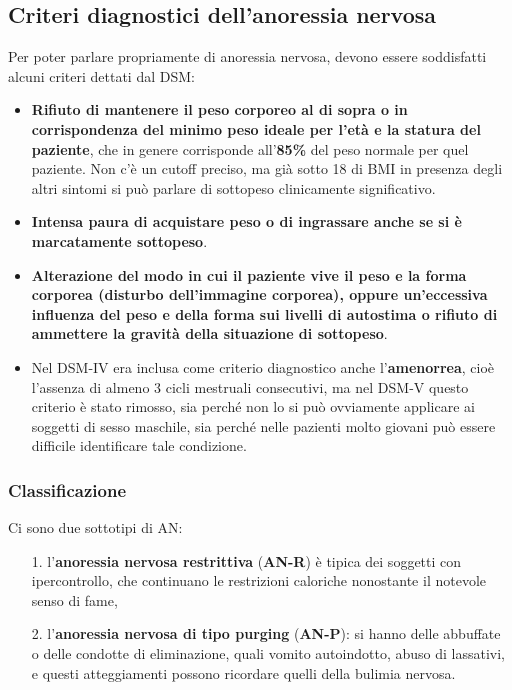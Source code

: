 \subsection{Criteri diagnostici dell'anoressia nervosa}

Per poter parlare propriamente di anoressia nervosa, devono essere
soddisfatti alcuni criteri dettati dal DSM:

\begin{itemize}
\item
  \textbf{Rifiuto di mantenere il peso corporeo al di sopra o in
  corrispondenza del minimo peso ideale per l'età e la statura del
  paziente}, che in genere corrisponde all'\textbf{85\%} del peso
  normale per quel paziente. Non c'è un cutoff preciso, ma già sotto 18
  di BMI in presenza degli altri sintomi si può parlare di sottopeso
  clinicamente significativo.
\item
  \textbf{Intensa paura di acquistare peso o di ingrassare anche se si è
  marcatamente sottopeso}.
\item
  \textbf{Alterazione del modo in cui il paziente vive il peso e la
  forma corporea (disturbo dell'immagine corporea), oppure un'eccessiva
  influenza del peso e della forma sui livelli di autostima o rifiuto di
  ammettere la gravità della situazione di sottopeso}.
\item
  Nel DSM-IV era inclusa come criterio diagnostico anche
  l'\textbf{amenorrea}, cioè l'assenza di almeno 3 cicli mestruali
  consecutivi, ma nel DSM-V questo criterio è stato rimosso, sia perché
  non lo si può ovviamente applicare ai soggetti di sesso maschile, sia
  perché nelle pazienti molto giovani può essere difficile identificare
  tale condizione.
\end{itemize}

\subsubsection{Classificazione}

Ci sono due sottotipi di AN:

\begin{itemize}
\item[1.]
  l'\textbf{anoressia nervosa restrittiva} (\textbf{AN-R}) è tipica dei
  soggetti con ipercontrollo, che continuano le restrizioni caloriche
  nonostante il notevole senso di fame,
\item[2.]
  l'\textbf{anoressia nervosa di tipo purging} (\textbf{AN-P}): si hanno
  delle abbuffate o delle condotte di eliminazione, quali vomito
  autoindotto, abuso di lassativi, e questi atteggiamenti possono
  ricordare quelli della bulimia nervosa.
\end{itemize}

